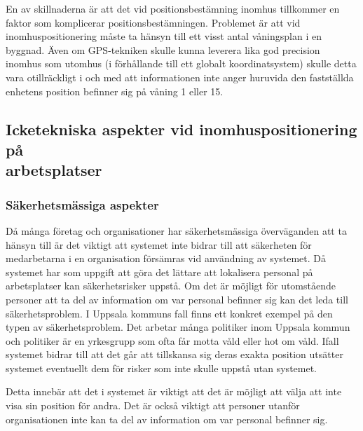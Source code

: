 \documentclass[swedish, a4paper,12pt]{article}
\begin{document}
En av skillnaderna är att det vid positionsbestämning inomhus tillkommer en faktor som komplicerar positionsbestämningen. Problemet är att vid inomhuspositionering måste ta hänsyn till ett visst antal våningsplan i en byggnad. Även om GPS-tekniken skulle kunna leverera lika god precision inomhus som utomhus (i förhållande till ett globalt koordinatsystem) skulle detta vara otillräckligt i och med att informationen inte anger huruvida den fastställda enhetens position befinner sig på våning 1 eller 15.


\subsection{Icketekniska aspekter vid inomhuspositionering på \\arbetsplatser}

\subsubsection{Säkerhetsmässiga aspekter}
Då många företag och organisationer har säkerhetsmässiga överväganden att ta hänsyn till är det viktigt att systemet inte bidrar till att säkerheten för medarbetarna i en organisation försämras vid användning av systemet.
Då systemet har som uppgift att göra det lättare att lokalisera personal på arbetsplatser kan säkerhetsrisker uppstå. Om det är möjligt för utomstående personer att ta del av information om var personal befinner sig kan det leda till säkerhetsproblem. I Uppsala kommuns fall finns ett konkret exempel på den typen av säkerhetsproblem. Det arbetar många politiker inom Uppsala kommun och politiker är en yrkesgrupp som ofta får motta våld eller hot om våld. Ifall systemet bidrar till att det går att tillskansa sig deras exakta position utsätter systemet eventuellt dem för risker som inte skulle uppstå utan systemet.

Detta innebär att det i systemet är viktigt att det är möjligt att välja att inte visa sin position för andra. Det är också viktigt att personer utanför organisationen inte kan ta del av information om var personal befinner sig.
\end{document}
